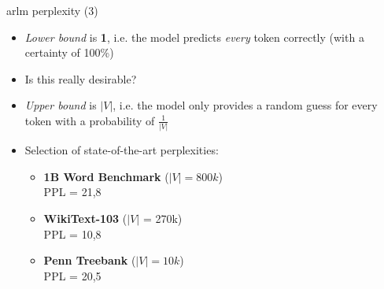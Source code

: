 
\begin{frame}{arlm perplexity (3)}

\vfill

\begin{itemize}
	\item \textit{Lower bound} is \textbf{1}, i.e. the model predicts \textit{every} token correctly (with a certainty of 100\%)
	\item \ques Is this really desirable?
	\item \textit{Upper bound} is $|V|$, i.e. the model only provides a random guess for every token with a probability of $\frac{1}{|V|}$
	\item Selection of state-of-the-art perplexities:
			\begin{itemize}
				\item \textbf{1B Word Benchmark}  ($|V| = 800k$)\\
				PPL = 21,8 
				\item \textbf{WikiText-103}  ($|V|$ = 270k)\\
				PPL = 10,8 
				\item \textbf{Penn Treebank}  ($|V| = 10k$)\\
				PPL = 20,5 
			\end{itemize}
\end{itemize}

\vfill

\end{frame}


